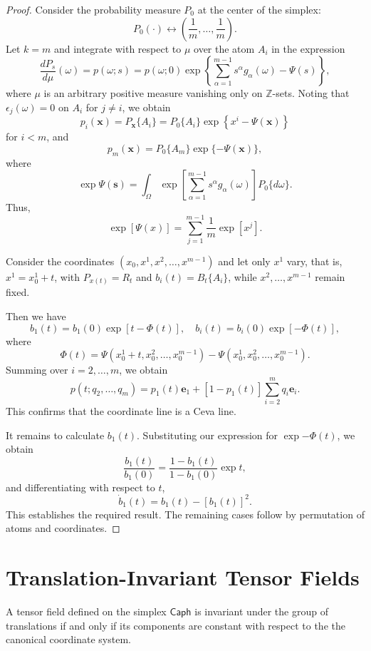 \begin{proof}
    Consider the probability measure $P_0$ at the center of the simplex:
    \[
    P_0 (\cdot) \leftrightarrow  \left(\frac{1}{m}, \dots, \frac{1}{m}\right).
    \]
    Let $k=m$ and integrate with respect to $\mu$ over the atom $A_i$ in the expression
    \[
    \frac{d P_s}{d\mu} (\omega) = p(\omega;s) = p(\omega; 0)
    \exp\left\{\sum_{\alpha=1}^{m-1}s^{\alpha}g_{\alpha}(\omega)- \Psi(s)\right\},
    \]
    where $\mu$ is an arbitrary positive measure vanishing only on $\mathbb{Z}$-sets. Noting that $\epsilon_j(\omega) = 0$ on $A_i$ for $j\neq i$, we obtain 
    \[
    p_i (\mathbf{x}) = P_{\mathbf{x}}\{ A_i\} =P_0 \{ A_i\} \exp\left\{x^i - \Psi(\mathbf{x})\right\}
    \]
    for $i < m$,
    and
    \[
    p_m(\mathbf{x}) = P_0 \{ A_m\} \exp\{- \Psi(\mathbf{x})\},
    \]
    where
    \[
    \exp{\Psi(\mathbf{s})} = \int_{\Omega} \exp\left[\sum_{\alpha=1}^{m-1} s^{\alpha}g_{\alpha}(\omega)\right] P_0\{ d \omega\}.
    \]
    Thus,
    \[
    \exp[ \Psi(x) ] = 
    \sum_{j=1}^{m-1} \frac{1}{m} \exp[x^j].
    \]

    Consider the coordinates $(x_0, x^1, x^2,\dots, x^{m-1})$ and let only $x^1$ vary, that is, $x^1 = x_0^1 +t$, with $P_{x(t)}= R_t$ and $b_i(t) = B_t\{ A_i\}$, while $x^2, \dots, x^{m-1}$ remain fixed.

    Then we have
    \[
    b_1(t) = b_1 (0) \exp [ t - \Phi(t) ], \quad b_i(t) = b_i (0) \exp [ - \Phi (t)],
    \]
    where
    \[
    \Phi (t) = \Psi(x_0^1 + t, x_0 ^2, \dots, x_0^{m-1}) - \Psi (x_0^1, x_0 ^2,\dots,x_0^{m-1}).
    \]
    Summing over $i=2,\dots,m$, we obtain
    \[
    p(t; q_2,\dots,q_m) = p_1(t)\mathbf{e}_1 +[1 - p_1(t)]\sum_{i=2}^m q_i \mathbf{e}_i.
    \]
    This confirms that the coordinate line is a Ceva line.

It remains to calculate $b_1(t)$. Substituting our expression for $\exp{- \Phi(t)}$, we obtain
    \[
    \frac{b_1(t)}{b_1(0)} = \frac{1 - b_1(t)}{1-b_1(0)} \exp{t},
    \]
    and differentiating with respect to $t$,
    \[
    \dot{b}_1(t) = b_1(t) - [b_1(t)]^2.
    \]
    This establishes the required result. The remaining cases follow by permutation of atoms and coordinates.
\end{proof}

\section{Translation-Invariant Tensor Fields}

\begin{theorem}
A tensor field defined on the simplex $\mathsf{Caph}$ is invariant under the group of translations if and only if its components are constant with respect to the the canonical coordinate system.
\end{theorem}

